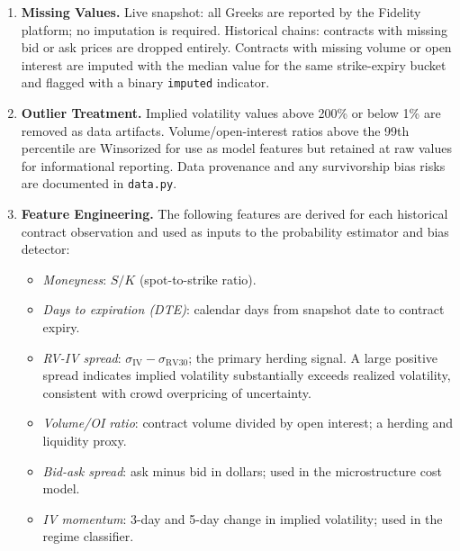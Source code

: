 \documentclass[12pt, letterpaper]{article}
\begin{document}
\begin{enumerate}
  \item \textbf{Missing Values.}  Live snapshot: all Greeks are
        reported by the Fidelity platform; no imputation is
        required. Historical chains: contracts with missing bid or
        ask prices are dropped entirely. Contracts with missing
        volume or open interest are imputed with the median value
        for the same strike-expiry bucket and flagged with a binary
        \texttt{imputed} indicator.

  \item \textbf{Outlier Treatment.}  Implied volatility values
        above 200\% or below 1\% are removed as data artifacts.
        Volume/open-interest ratios above the 99th percentile are
        Winsorized for use as model features but retained at raw
        values for informational reporting. Data provenance and
        any survivorship bias risks are documented in
        \texttt{data.py}.

  \item \textbf{Feature Engineering.}  The following features are
        derived for each historical contract observation and used
        as inputs to the probability estimator and bias detector:
        \begin{itemize}
          \item \textit{Moneyness}: $S / K$ (spot-to-strike ratio).
          \item \textit{Days to expiration (DTE)}: calendar days
                from snapshot date to contract expiry.
          \item \textit{RV-IV spread}:
                $\sigma_{\text{IV}} - \sigma_{\text{RV30}}$; the
                primary herding signal. A large positive spread
                indicates implied volatility substantially exceeds
                realized volatility, consistent with crowd
                overpricing of uncertainty.
          \item \textit{Volume/OI ratio}: contract volume divided
                by open interest; a herding and liquidity proxy.
          \item \textit{Bid-ask spread}: ask minus bid in dollars;
                used in the microstructure cost model.
          \item \textit{IV momentum}: 3-day and 5-day change in
                implied volatility; used in the regime classifier.
        \end{itemize}


\end{enumerate}
\end{document}
